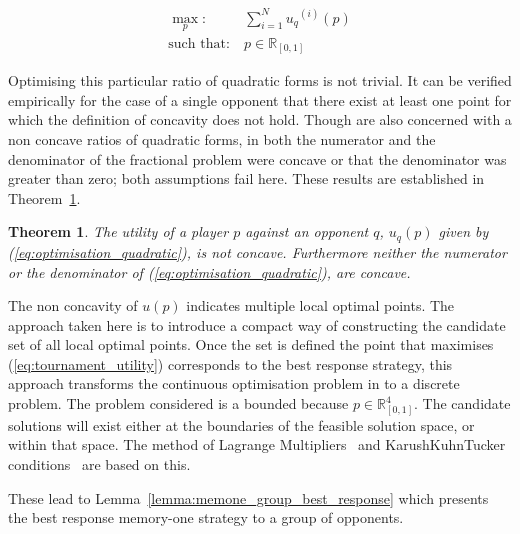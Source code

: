 \documentclass[10pt]{article}
\newcommand{\R}{\mathbb{R}}
\newtheorem{theorem}{Theorem}
\begin{document}
\begin{equation}\label{eq:mo_tournament_optimisation}
    \begin{aligned}
    \max_p: & \ \sum_{i=1} ^ {N} {u_q}^{(i)} (p)
    \\
    \text{such that}: & \ p \in \R_{[0, 1]}
    \end{aligned}
\end{equation}

Optimising this particular ratio of quadratic forms is not trivial. It can be
verified empirically for the case of a single opponent that there exist at least
one point for which the definition of concavity does not hold. Though
\cite{Beck2009, Hongyan2014} are also concerned with a non concave ratios of
quadratic forms, in both the numerator and the denominator of the fractional
problem were concave or that the denominator was greater than zero; both
assumptions fail here. These results are established in
Theorem~\ref{theorem:concavity}.

\begin{theorem}\label{theorem:concavity}
    The utility of a player \(p\) against an opponent \(q\), \(u_q (p)\) given
    by (\ref{eq:optimisation_quadratic}), is not concave. Furthermore neither
    the numerator or the denominator of (\ref{eq:optimisation_quadratic}), are
    concave.
\end{theorem}

The non concavity of \(u(p)\) indicates multiple local optimal points. The
approach taken here is to introduce a compact way of constructing the candidate
set of all local optimal points. Once the set is defined the point that
maximises (\ref{eq:tournament_utility}) corresponds to the best response
strategy, this approach transforms the continuous optimisation problem in to a
discrete problem. The problem considered is a bounded because \(p \in \R^4_{[0,
1]}\). The candidate solutions will exist either at the boundaries of the
feasible solution space, or within that space. The method of Lagrange
Multipliers~\cite{bertsekas2014} and Karush\-Kuhn\-Tucker
conditions~\cite{Giorgi2016} are based on this.

These lead to Lemma~\ref{lemma:memone_group_best_response} which
presents the best response memory-one strategy to a group of opponents.
\end{document}
